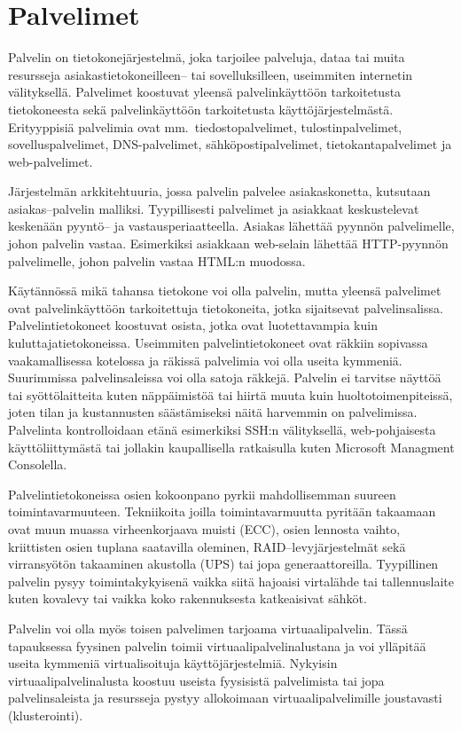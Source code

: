 \section{Palvelimet}\label{palvelimet}

Palvelin on tietokonejärjestelmä, joka tarjoilee palveluja, dataa tai muita resursseja asiakastietokoneilleen– tai sovelluksilleen, useimmiten internetin välityksellä. Palvelimet koostuvat yleensä palvelinkäyttöön tarkoitetusta tietokoneesta sekä palvelinkäyttöön tarkoitetusta käyttöjärjestelmästä. Erityyppisiä palvelimia ovat mm.\ tiedostopalvelimet, tulostinpalvelimet, sovelluspalvelimet, DNS-palvelimet, sähköpostipalvelimet, tietokantapalvelimet ja web-palvelimet.

Järjestelmän arkkitehtuuria, jossa palvelin palvelee asiakaskonetta, kutsutaan asiakas–palvelin malliksi. Tyypillisesti palvelimet ja asiakkaat keskustelevat keskenään pyyntö– ja vastausperiaatteella. Asiakas lähettää pyynnön palvelimelle, johon palvelin vastaa. Esimerkiksi asiakkaan web-selain lähettää HTTP-pyynnön palvelimelle, johon palvelin vastaa HTML:n muodossa.

Käytännössä mikä tahansa tietokone voi olla palvelin, mutta yleensä palvelimet ovat palvelinkäyttöön tarkoitettuja tietokoneita, jotka sijaitsevat palvelinsalissa. Palvelintietokoneet koostuvat osista, jotka ovat luotettavampia kuin kuluttajatietokoneissa. Useimmiten palvelintietokoneet ovat räkkiin sopivassa vaakamallisessa kotelossa ja räkissä palvelimia voi olla useita kymmeniä. Suurimmissa palvelinsaleissa voi olla satoja räkkejä. Palvelin ei tarvitse näyttöä tai syöttölaitteita kuten näppäimistöä tai hiirtä muuta kuin huoltotoimenpiteissä, joten tilan ja kustannusten säästämiseksi näitä harvemmin on palvelimissa. Palvelinta kontrolloidaan etänä esimerkiksi SSH:n välityksellä, web-pohjaisesta käyttöliittymästä tai jollakin kaupallisella ratkaisulla kuten Microsoft Managment Consolella.

Palvelintietokoneissa osien kokoonpano pyrkii mahdollisemman suureen toimintavarmuuteen. Tekniikoita joilla toimintavarmuutta pyritään takaamaan ovat muun muassa virheenkorjaava muisti (ECC), osien lennosta vaihto, kriittisten osien tuplana saatavilla oleminen, RAID–levyjärjestelmät sekä virransyötön takaaminen akustolla (UPS) tai jopa generaattoreilla. Tyypillinen palvelin pysyy toimintakykyisenä vaikka siitä hajoaisi virtalähde tai tallennuslaite kuten kovalevy tai vaikka koko rakennuksesta katkeaisivat sähköt.~\cite{paessler}

Palvelin voi olla myös toisen palvelimen tarjoama virtuaalipalvelin. Tässä tapauksessa fyysinen palvelin toimii virtuaalipalvelinalustana ja voi ylläpitää useita kymmeniä virtualisoituja käyttöjärjestelmiä. Nykyisin virtuaalipalvelinalusta koostuu useista fyysisistä palvelimista tai jopa palvelinsaleista ja resursseja pystyy allokoimaan virtuaalipalvelimille joustavasti (klusterointi).

